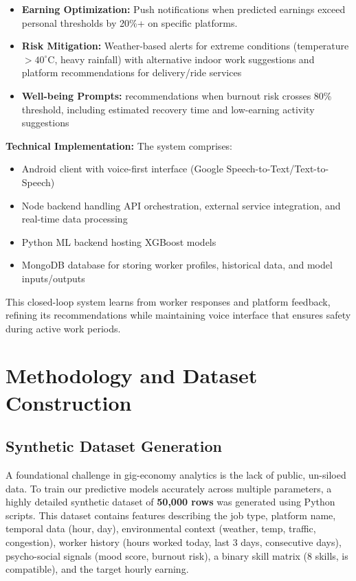 \documentclass[12pt,a4paper]{article}
\begin{document}
\begin{itemize}
    \item \textbf{Earning Optimization:} Push notifications when predicted earnings exceed personal thresholds by 20\%+ on specific platforms.
    \item \textbf{Risk Mitigation:} Weather-based alerts for extreme conditions (temperature$> 40^{\circ}$C, heavy rainfall) with alternative indoor work suggestions and platform recommendations for delivery/ride services
    \item \textbf{Well-being Prompts:} recommendations when burnout risk crosses 80\% threshold, including estimated recovery time and low-earning activity suggestions
\end{itemize}
\vspace{0.4cm}
\par\noindent
\textbf{Technical Implementation:} The system comprises:
\begin{itemize}
    \item Android client with voice-first interface (Google Speech-to-Text/Text-to-Speech)
    \item Node backend handling API orchestration, external service integration, and real-time data processing
    \item Python ML backend hosting XGBoost models
    \item MongoDB database for storing worker profiles, historical data, and model inputs/outputs
\end{itemize}
\vspace{0.4cm}
\par\noindent
This closed-loop system learns from worker responses and platform feedback, refining its recommendations while maintaining voice interface that ensures safety during active work periods.
\newpage
\section{Methodology and Dataset Construction}
\subsection{Synthetic Dataset Generation}
\par\noindent
A foundational challenge in gig-economy analytics is the lack of public, un-siloed data. To train our predictive models accurately across multiple parameters, a highly detailed synthetic dataset of \textbf{50,000 rows} was generated using Python scripts. This dataset contains features describing the job type, platform name, temporal data (hour, day), environmental context (weather, temp, traffic, congestion), worker history (hours worked today, last 3 days, consecutive days), psycho-social signals (mood score, burnout risk), a binary skill matrix (8 skills, is compatible), and the target hourly earning.
\end{document}
